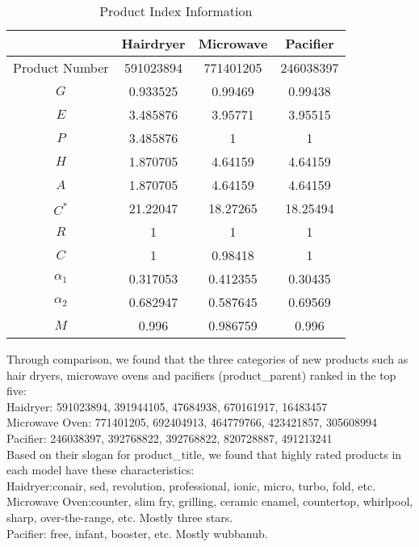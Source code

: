 \documentclass{mcmthesis}
\begin{document}
\begin{table}[]
	\centering
	\caption{Product Index Information}
	\begin{tabular}{cccc}
		\toprule[2pt]
		& Hairdryer       & Microwave        & Pacifier \\ \hline
		Product Number & 591023894 & 771401205 & 246038397 \\
		$ G $    & 0.933525  & 0.99469   & 0.99438 \\
		$ E $    & 3.485876  & 3.95771   & 3.95515 \\
		$ P $    & 3.485876  & 1         & 1 \\
		$ H $    & 1.870705  & 4.64159   & 4.64159 \\
		$ A $    & 1.870705  & 4.64159   & 4.64159 \\
		$ C^* $    & 21.22047  & 18.27265  & 18.25494 \\
		$ R $    & 1         & 1         & 1 \\
		$ C $    & 1         & 0.98418   & 1 \\
		$ \alpha_1 $    & 0.317053  & 0.412355  & 0.30435 \\
		$ \alpha_2 $    & 0.682947  & 0.587645  & 0.69569 \\
		$ M $    & 0.996     & 0.986759  & 0.996 \\ \bottomrule[2pt]
	\end{tabular}
\end{table}
Through comparison, we found that the three categories of new products such as hair dryers, microwave ovens and pacifiers (product\_parent) ranked in the top five:\\
Haidryer: 591023894, 391944105, 47684938, 670161917, 16483457\\
Microwave Oven: 771401205, 692404913, 464779766, 423421857, 305608994\\
Pacifier: 246038397, 392768822, 392768822, 820728887, 491213241\\
Based on their slogan for product\_title, we found that highly rated products in each model have these characteristics:\\
Haidryer:conair, sed, revolution, professional, ionic, micro, turbo, fold, etc.\\
Microwave Oven:counter, slim fry, grilling, ceramic enamel, countertop, whirlpool, sharp, over-the-range, etc. Mostly three stars.\\
Pacifier: free, infant, booster, etc. Mostly wubbanub.\\
\end{document}
